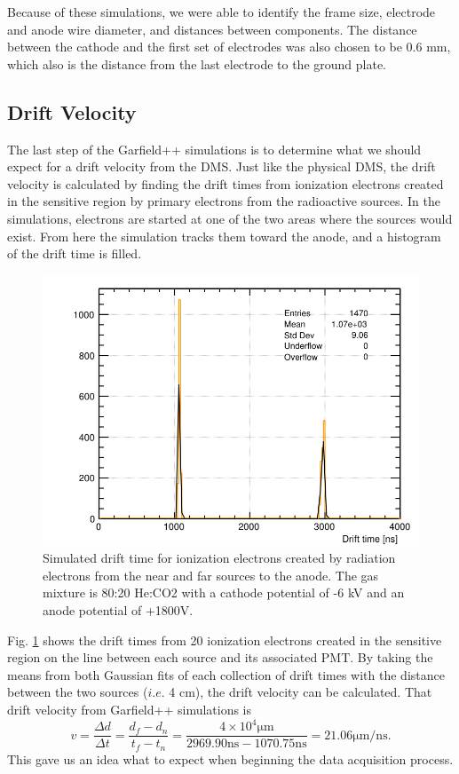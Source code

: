 Because of these simulations, we were able to identify the frame size, electrode and anode wire diameter, and distances between components. The distance between the cathode and the first set of electrodes was also chosen to be 0.6 mm, which also is the distance from the last electrode to the ground plate.

\subsection{Drift Velocity}
The last step of the Garfield++ simulations is to determine what we should expect for a drift velocity from the DMS. Just like the physical DMS, the drift velocity is calculated by finding the drift times from ionization electrons created in the sensitive region by primary electrons from the radioactive sources. In the simulations, electrons are started at one of the two areas where the sources would exist. From here the simulation tracks them toward the anode, and a histogram of the drift time is filled.

\begin{figure}[h!]
	\centering
	\includegraphics[width=0.8\linewidth]{figures/vdc_sim_td.png}
	\caption{Simulated drift time for ionization electrons created by radiation electrons from the near and far sources to the anode. The gas mixture is 80:20 He:CO2 with a cathode potential of -6 kV and an anode potential of +1800V.}
	\label{fig:vdc_sim_td}
\end{figure}

Fig. \ref{fig:vdc_sim_td} shows the drift times from 20 ionization electrons created in the sensitive region on the line between each source and its associated PMT. By taking the means from both Gaussian fits of each collection of drift times with the distance between the two sources ($i.e.$ 4 cm), the drift velocity can be calculated. That drift velocity from Garfield++ simulations is
\begin{equation}
v = \frac{\Delta d}{\Delta t} = \frac{d_f - d_n}{t_f - t_n} = \frac{4 \times 10^{4} \mathrm{\mu m}} {2969.90 \mathrm{ ns} - 1070.75 \mathrm{ ns}} = 21.06  \mathrm{ \mu m/ns}.
\end{equation}
This gave us an idea what to expect when beginning the data acquisition process. 
